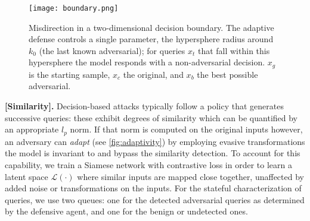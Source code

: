 \begin{figure}
    \centering
    \texttt{[image: boundary.png]}
    \caption{Misdirection in a two-dimensional decision boundary. The adaptive defense controls a single parameter, the hypersphere radius around $k_0$ (the last known adversarial); for queries $x_t$ that fall within this hypersphere the model responds with a non-adversarial decision. $x_g$ is the starting sample, $x_c$ the original, and $x_b$ the best possible adversarial.}
    \label{fig:boundary}
\end{figure}

\textbf{[Similarity].} Decision-based attacks typically follow a policy that generates successive queries: these exhibit degrees of similarity which can be quantified by an appropriate $l_p$ norm.
If that norm is computed on the original inputs however, an adversary can \textit{adapt} (see \autoref{fig:adaptivity}) by employing evasive transformations the model is invariant to and bypass the similarity detection.
To account for this capability, we train a Siamese network with contrastive loss in order to learn a latent space $\mathcal{L}(\cdot)$ where similar inputs are mapped close together, unaffected by added noise or transformations on the inputs.
For the stateful characterization of queries, we use two queues: one for the detected adversarial queries as determined by the defensive agent, and one for the benign or undetected ones.

